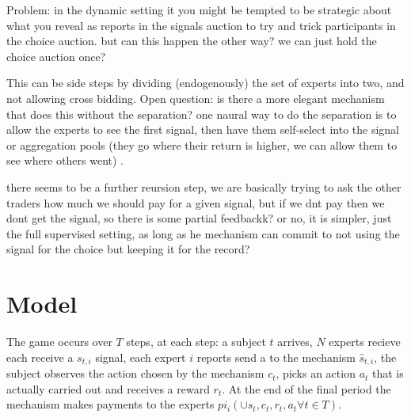 Problem: in the dynamic setting it you might be tempted to be strategic about what you reveal as reports in the signals auction to try and trick participants in the choice auction. 
but can this happen the other way? we can just hold the choice auction once? 

This can be side steps by dividing (endogenously) the set of experts into two, and not allowing cross bidding. Open question: is there a more elegant mechanism that does this without the separation? one naural way to do the separation is to allow the experts to see the first signal, then have them self-select into the signal or aggregation pools (they go where their return is higher, we can allow them to see where others went) .


there seems to be a further reursion step, we are basically trying to ask the other traders how much we should pay for a given signal, but if we dnt pay then we dont get the signal, so there is some partial feedbackk? or no, it is simpler, just the full supervised setting, as long as he mechanism can commit to not using the signal for the choice but keeping it for the record?










\section{Model}

The game occurs over $T$ steps, at each step: a subject $t$ arrives, $N$ experts recieve each receive a $s_{t,i}$ signal, each expert $i$ reports send a to the mechanism $\hat{s}_{t,i}$, the subject observes the action chosen by the mechanism $c_t$, picks an action $a_t$ that is actually carried out and receives a reward $r_t$.
At the end of the final period the mechanism makes payments to the experts $pi_i( \cup \hat{s}_t,c_t,r_t,a_t \forall t \in T)$.

